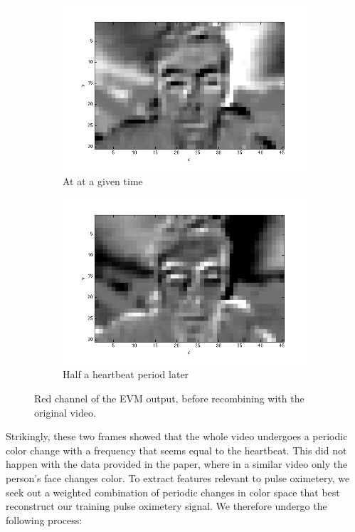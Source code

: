 \documentclass[12pt]{article}
\begin{document}
\begin{figure}
\begin{subfigure}{.5\textwidth}
\captionsetup{justification=centering}
\includegraphics[width=\textwidth]{images/red_peak.png}
\caption{At at a given time}
\end{subfigure}
\begin{subfigure}{.5\textwidth}
\captionsetup{justification=centering}
\includegraphics[width=\textwidth]{images/red_trough.png}
\caption{Half a heartbeat period later}
\end{subfigure}
\captionsetup{justification=centering}
\caption{Red channel of the EVM output, before recombining with the original video.}
\end{figure}

Strikingly, these two frames showed that the whole video undergoes a periodic color change with a frequency that seems equal to the heartbeat. This did not happen with the data provided in the paper, where in a similar video only the person's face changes color.
To extract features relevant to pulse oximetery, we seek out a weighted combination of periodic changes in color space that best reconstruct our training pulse oximetery signal. We therefore undergo the following process:
\end{document}
